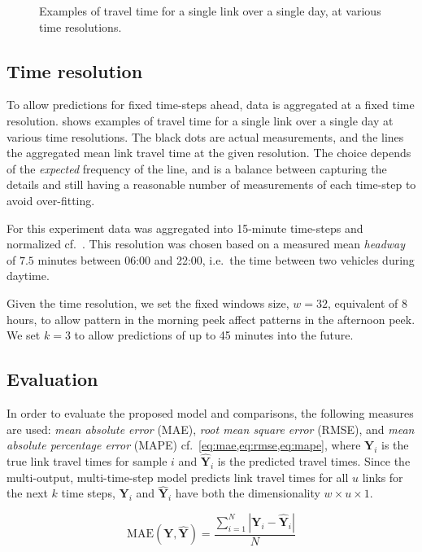 \documentclass[preprint,11pt,5p,twocolumn]{elsarticle}
\newcommand{\matr}[1]{\mathbf{#1}}
\begin{document}
\begin{figure}[!t]
    \caption{Examples of travel time for a single link over a single day, at various time resolutions.}
    \label{fig:resolutions}
\end{figure}

\subsection{Time resolution}
To allow predictions for fixed time-steps ahead, data is aggregated at a fixed time resolution.  shows examples of travel time for a single link over a single day at various time resolutions. The black dots are actual measurements, and the lines the aggregated mean link travel time at the given resolution. The choice depends of the \emph{expected} frequency of the line, and is a balance between capturing the details and still having a reasonable number of measurements of each time-step to avoid over-fitting.

For this experiment data was aggregated into 15-minute time-steps and normalized cf.~. This resolution was chosen based on a measured mean \emph{headway} of $7.5$ minutes between 06:00 and 22:00, i.e.\ the time between two vehicles during daytime.

Given the time resolution, we set the fixed windows size, $w = 32$, equivalent of 8 hours, to allow pattern in the morning peek affect patterns in the afternoon peek. We set $k = 3$ to allow predictions of up to 45 minutes into the future. 

\subsection{Evaluation}
In order to evaluate the proposed model and comparisons, the following measures are used: \emph{mean absolute error} (MAE), \emph{root mean square error} (RMSE), and \emph{mean absolute percentage error} (MAPE) cf.~\cref{eq:mae,eq:rmse,eq:mape}, where $\matr{Y}_i$ is the true link travel times for sample $i$ and $\matr{\widehat{Y}}_i$ is the predicted travel times. Since the multi-output, multi-time-step model predicts link travel times for all $u$ links for the next $k$ time steps, $\matr{Y}_i$ and $\matr{\widehat{Y}}_i$ have both the dimensionality $w \times u \times 1$.

\begin{equation}
    \textrm{MAE}(\matr{Y}, \matr{\widehat{Y}}) = \frac{\sum_{i = 1}^{N} \left| \matr{Y}_i - \matr{\widehat{Y}}_i \right| }{N}
    \label{eq:mae}
\end{equation}
\end{document}
